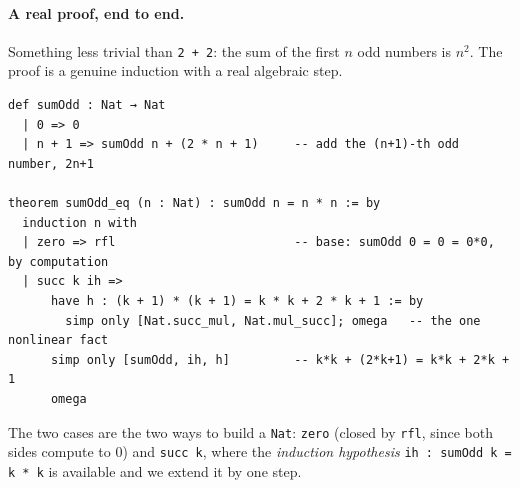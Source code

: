 \documentclass[11pt]{article}
\newcommand{\code}[1]{\lstinline[basicstyle=\ttfamily]|#1|}
\begin{document}
\paragraph{A real proof, end to end.} Something less trivial than
\code{2 + 2}: the sum of the first $n$ odd numbers is $n^2$. The proof is a
genuine induction with a real algebraic step.

\begin{lstlisting}
def sumOdd : Nat → Nat
  | 0 => 0
  | n + 1 => sumOdd n + (2 * n + 1)     -- add the (n+1)-th odd number, 2n+1

theorem sumOdd_eq (n : Nat) : sumOdd n = n * n := by
  induction n with
  | zero => rfl                         -- base: sumOdd 0 = 0 = 0*0, by computation
  | succ k ih =>
      have h : (k + 1) * (k + 1) = k * k + 2 * k + 1 := by
        simp only [Nat.succ_mul, Nat.mul_succ]; omega   -- the one nonlinear fact
      simp only [sumOdd, ih, h]         -- k*k + (2*k+1) = k*k + 2*k + 1
      omega
\end{lstlisting}

\noindent The two cases are the two ways to build a \code{Nat}: \code{zero}
(closed by \code{rfl}, since both sides compute to $0$) and \code{succ k}, where
the \emph{induction hypothesis} \code{ih : sumOdd k = k * k} is available and we
extend it by one step.
\end{document}
